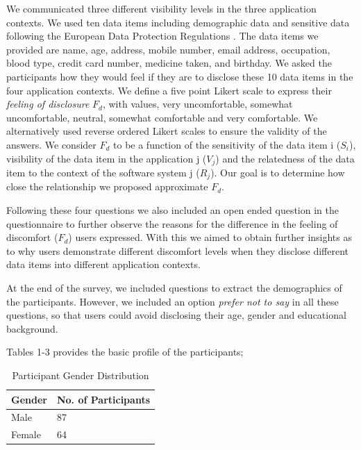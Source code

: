 \documentclass[conference]{IEEEtran}
\begin{document}
We communicated three different visibility levels in the three application contexts. We used ten data items including demographic data and sensitive data following the European Data Protection Regulations \cite {wagner2016national}. The data items we provided are name, age, address, mobile number, email address, occupation, blood type, credit card number, medicine taken, and birthday. We asked the participants how they would feel if they are to disclose these 10 data items in the four application contexts. We define a five point Likert scale to express their \textit{feeling of disclosure} $F_d$, with values, very uncomfortable, somewhat uncomfortable, neutral, somewhat comfortable and very comfortable. We alternatively used reverse ordered Likert scales to ensure the validity of the answers. We consider $F_d$ to be a function of the sensitivity of the data item i ($S_i$), visibility of the data item in the application j ($V_j$) and the relatedness of the data item to the context of the software system j ($R_j$). Our goal is to determine how close the relationship we proposed approximate $F_d$.

Following these four questions we also included an open ended question in the questionnaire to further observe the reasons for the difference in the feeling of discomfort ($F_d$) users expressed. With this we aimed to obtain further insights as to why users demonstrate different discomfort levels when they disclose different data items into different application contexts. 

At the end of the survey, we included questions to extract the demographics of the participants. However, we included an option \textit{prefer not to say} in all these questions, so that users could avoid disclosing their age, gender and educational background.

Tables 1-3 provides the basic profile of the participants;

\begin{center}
\begin{table}[htbp]
\caption{Participant Gender Distribution}
\begin{center}
\begin{tabular}{|l|l|} 
\hline
Gender & No. of Participants \\
\hline
Male & 87 \\
\hline
Female & 64 \\
\hline
\end{tabular}
\end{center}
\end{table}
\end{center} 
\end{document}
